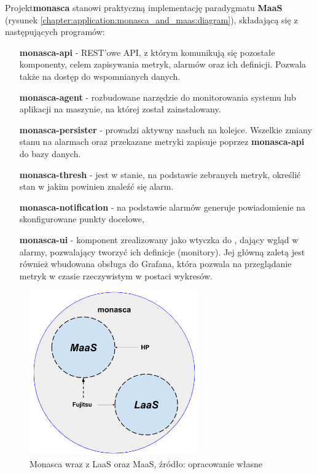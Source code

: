 Projekt\textbf{monasca} stanowi praktyczną implementację paradygmatu \textbf{MaaS} 
(rysunek \ref{chapter:application:monasca_and_maas:diagram}), składającą się z następujących
programów:
\begin{itemize}
    \item[\textbf{monasca-api}] - REST'owe API, z którym komunikują się pozostałe komponenty, celem zapisywania metryk, alarmów oraz ich definicji.
    Pozwala także na dostęp do wspomnianych danych.
    \item[\textbf{monasca-agent}] - rozbudowane narzędzie do monitorowania systemu lub aplikacji na maszynie, na której został zainstalowany.
    \item[\textbf{monasca-persister}] - prowadzi aktywny nasłuch na kolejce. Wszelkie zmiany stanu na alarmach oraz przekazane metryki zapisuje
    poprzez \textbf{monasca-api} do bazy danych.
    \item[\textbf{monasca-thresh}] - jest w stanie, na podstawie zebranych metryk, określić stan w jakim powinien znaleźć się alarm.
    \item[\textbf{monasca-notification}] - na podstawie alarmów generuje powiadomienie na skonfigurowane punkty docelowe,
    \item[\textbf{monasca-ui}] - komponent zrealizowany jako wtyczka do , dający wgląd w alarmy, pozwalający tworzyć ich definicje (monitory).
    Jej główną zaletą jest również wbudowana obsługa do Grafana, która pozwala na przeglądanie metryk w czasie rzeczywistym w postaci wykresów.
\end{itemize}

\begin{figure}[H]
    \centering
    \includegraphics[width=0.65\textwidth]{images/monasca_with_laas}
    \caption[Monasca wraz z LaaS oraz MaaS]{
        Monasca wraz z LaaS oraz MaaS, źródło: opracowanie własne
    }
    \label{chapter:application:monasca_with_laas:diagram}
\end{figure}


